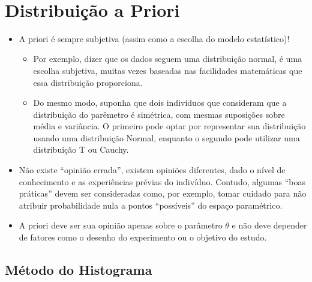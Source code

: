 \documentclass[
]{book}
\providecommand{\tightlist}{%
  \setlength{\itemsep}{0pt}\setlength{\parskip}{0pt}}
\begin{document}
\(~\)

\hypertarget{distribuiuxe7uxe3o-a-priori}{%
\section{Distribuição a Priori}\label{distribuiuxe7uxe3o-a-priori}}

\begin{itemize}
\tightlist
\item
  A priori é sempre subjetiva (assim como a escolha do modelo estatístico)!

  \begin{itemize}
  \tightlist
  \item
    Por exemplo, dizer que os dados seguem uma distribuição normal, é uma escolha subjetiva, muitas vezes baseadas nas facilidades matemáticas que essa distribuição proporciona.\\
  \item
    Do mesmo modo, suponha que dois indivíduos que consideram que a distribuição do parêmetro é simétrica, com mesmas suposições sobre média e variância. O primeiro pode optar por representar sua distribuição usando uma distribuição Normal, enquanto o segundo pode utilizar uma distribuição T ou Cauchy.\\
  \end{itemize}
\item
  Não existe ``opinião errada'', existem opiniões diferentes, dado o nível de conhecimento e as experiências prévias do indivíduo. Contudo, algumas ``boas práticas'' devem ser consideradas como, por exemplo, tomar cuidado para não atribuir probabilidade nula a pontos ``possíveis'' do espaço paramétrico.\\
\item
  A priori deve ser sua opinião apenas sobre o parâmetro \(\theta\) e não deve depender de fatores como o desenho do experimento ou o objetivo do estudo.
\end{itemize}

\hypertarget{muxe9todo-do-histograma}{%
\subsection{Método do Histograma}\label{muxe9todo-do-histograma}}
\end{document}
